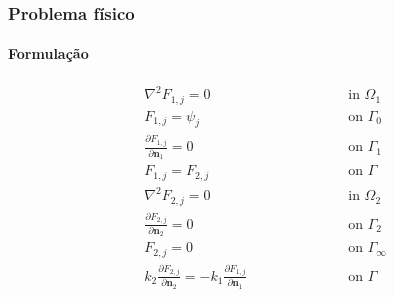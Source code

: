 \documentclass{beamer}
\begin{document}
\begin{frame}
	\frametitle{Problema físico}
	\framesubtitle{Formulação}
	\begin{subequations}
		\begin{alignat}{2}
		& \nabla^2 F_{1,j} = 0 \quad\quad\quad\quad\quad && \text{ in } \Omega_1 \label{funcao_F_harm_T1} \\
		& F_{1,j} = \psi_j && \text{ on } \Gamma_0  \label{funcao_F_cc_T1_2} \\
		& \frac{\partial F_{1,j}}{\partial \mathbf{n}_1} = 0 && \text{ on }  \Gamma_1 \label{funcao_F_cc_T1_1} \\ 
		& F_{1,j} = F_{2, j} \quad\quad\quad\quad\quad\quad\quad\quad && \text{ on }  \Gamma \label{funcao_F_cc_grad_T1} \\
		& \nabla^2 F_{2,j} = 0 && \text{ in }  \Omega_2 \label{funcao_F_harm_T2} \\
		& \frac{\partial F_{2,j}}{\partial \mathbf{n}_2} = 0 && \text{ on }  \Gamma_2 \label{funcao_F_cc_T1_3} \\
		& F_{2,j} = 0 && \text{ on }  \Gamma_\infty \label{funcao_F_cc_T1_4} \\
		& k_2\frac{\partial F_{2, j}}{\partial\mathbf{n}_2} = - k_1\frac{\partial F_{1,j}}{\partial\mathbf{n}_1} && \text{ on }  \Gamma \label{funcao_F_cc_T1_5}
		\end{alignat}
	\end{subequations}
\end{frame}
\end{document}
